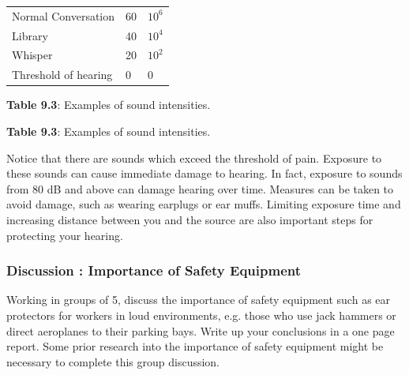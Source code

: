 \begin{table}[H]
\begin{center}
\begin{xtabular}[t]{|l|l|l|}
     \tabularnewline{}
        Normal Conversation &
        60 &
                  ${10}^{6}$
     \tabularnewline{}
        Library &
        40 &
                  ${10}^{4}$
     \tabularnewline{}
        Whisper &
        20 &
                  ${10}^{2}$
     \tabularnewline{}
        Threshold of hearing &
        0 &
        0%
     \tabularnewline{}
    \end{xtabular}
      \end{center}
    \begin{center}{\small\bfseries Table 9.3}: Examples of sound intensities.\end{center}
    \begin{caption}{\small\bfseries Table 9.3}: Examples of sound intensities.\end{caption}
\end{table}
    \par
        \label{m38800*id185097}Notice that there are sounds which exceed the threshold
of pain. Exposure to these sounds can cause immediate damage to hearing.
In fact, exposure to sounds from
80 dB and above can damage hearing over time. Measures
can be taken to avoid damage, such as wearing earplugs
or ear muffs. Limiting exposure time and
increasing distance between you and the source are also
important steps for protecting your hearing.\par 
\label{m38800*secfhsst!!!underscore!!!id469}
            \subsubsection{  Discussion : Importance of Safety Equipment }
            \nopagebreak
        \label{m38800*id185111}Working in groups of 5, discuss the importance of safety equipment such as ear protectors for workers in loud environments, e.g. those who use jack hammers or direct aeroplanes to their parking bays. Write up your conclusions in a one page report. Some prior research into the importance of safety equipment might be necessary to complete this group discussion. \par 
\label{m38800*cid8}
